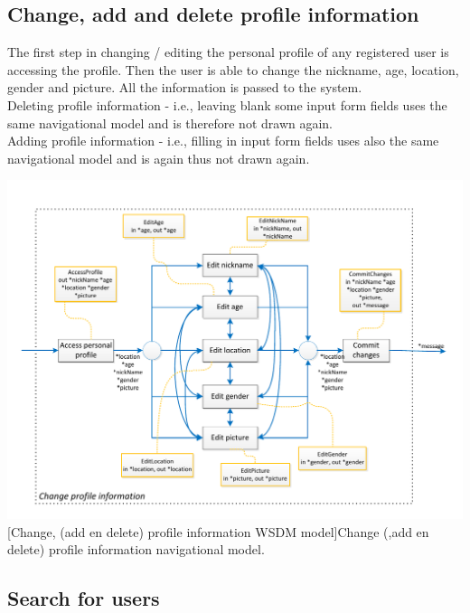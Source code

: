 \documentclass[11pt, a4paper,svglistings,oneside]{book}
\begin{document}
\clearpage

\subsection{Change, add and delete profile information}

The first step in changing / editing the personal profile of any registered user is accessing the profile. Then the user is able to change the nickname, age, location, gender and picture. All the information is passed to the system. \\
Deleting profile information - i.e., leaving blank some input form fields uses the same navigational model and is therefore not drawn again. \\
Adding profile information - i.e., filling in input form fields uses also the same navigational model and is again thus not drawn again.
$\;$ \\
\noindent\begin{minipage}{\textwidth}
    \centering
   \includegraphics[scale=0.85]{Nav_ChangeProfileInformation.pdf}
 [Change, (add en delete) profile information WSDM model]{Change (,add en delete) profile information navigational model.}
\end{minipage}

\subsection{Search for users}
\end{document}
